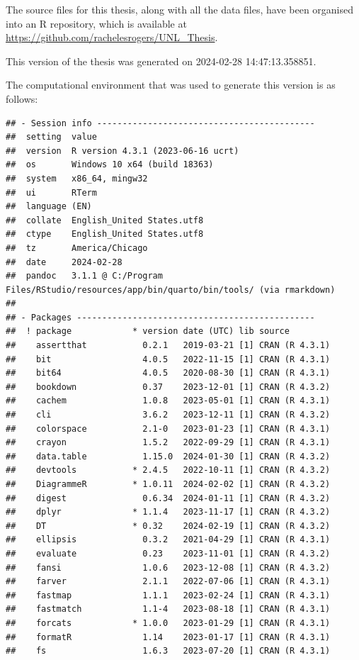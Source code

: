\documentclass[print]{nuthesis}
\begin{document}
The source files for this thesis, along with all the data files, have been organised into an R repository, which is available at \url{https://github.com/rachelesrogers/UNL_Thesis}.

This version of the thesis was generated on 2024-02-28 14:47:13.358851.

The computational environment that was used to generate this version is as follows:

\begin{verbatim}
## - Session info -------------------------------------------
##  setting  value
##  version  R version 4.3.1 (2023-06-16 ucrt)
##  os       Windows 10 x64 (build 18363)
##  system   x86_64, mingw32
##  ui       RTerm
##  language (EN)
##  collate  English_United States.utf8
##  ctype    English_United States.utf8
##  tz       America/Chicago
##  date     2024-02-28
##  pandoc   3.1.1 @ C:/Program Files/RStudio/resources/app/bin/quarto/bin/tools/ (via rmarkdown)
## 
## - Packages -----------------------------------------------
##  ! package            * version date (UTC) lib source
##    assertthat           0.2.1   2019-03-21 [1] CRAN (R 4.3.1)
##    bit                  4.0.5   2022-11-15 [1] CRAN (R 4.3.1)
##    bit64                4.0.5   2020-08-30 [1] CRAN (R 4.3.1)
##    bookdown             0.37    2023-12-01 [1] CRAN (R 4.3.2)
##    cachem               1.0.8   2023-05-01 [1] CRAN (R 4.3.1)
##    cli                  3.6.2   2023-12-11 [1] CRAN (R 4.3.2)
##    colorspace           2.1-0   2023-01-23 [1] CRAN (R 4.3.1)
##    crayon               1.5.2   2022-09-29 [1] CRAN (R 4.3.1)
##    data.table           1.15.0  2024-01-30 [1] CRAN (R 4.3.2)
##    devtools           * 2.4.5   2022-10-11 [1] CRAN (R 4.3.2)
##    DiagrammeR         * 1.0.11  2024-02-02 [1] CRAN (R 4.3.2)
##    digest               0.6.34  2024-01-11 [1] CRAN (R 4.3.2)
##    dplyr              * 1.1.4   2023-11-17 [1] CRAN (R 4.3.2)
##    DT                 * 0.32    2024-02-19 [1] CRAN (R 4.3.2)
##    ellipsis             0.3.2   2021-04-29 [1] CRAN (R 4.3.1)
##    evaluate             0.23    2023-11-01 [1] CRAN (R 4.3.2)
##    fansi                1.0.6   2023-12-08 [1] CRAN (R 4.3.2)
##    farver               2.1.1   2022-07-06 [1] CRAN (R 4.3.1)
##    fastmap              1.1.1   2023-02-24 [1] CRAN (R 4.3.1)
##    fastmatch            1.1-4   2023-08-18 [1] CRAN (R 4.3.1)
##    forcats            * 1.0.0   2023-01-29 [1] CRAN (R 4.3.1)
##    formatR              1.14    2023-01-17 [1] CRAN (R 4.3.1)
##    fs                   1.6.3   2023-07-20 [1] CRAN (R 4.3.1)

\end{verbatim}
\end{document}
